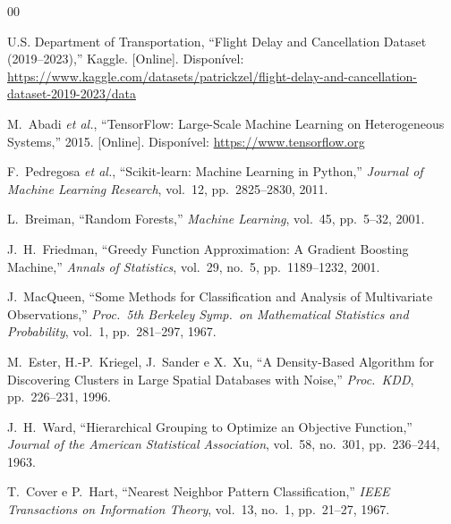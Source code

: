 \documentclass[conference]{IEEEtran}
\begin{document}
\begin{thebibliography}{00}

U.S. Department of Transportation, ``Flight Delay and Cancellation Dataset
(2019–2023),'' Kaggle. [Online]. Disponível:
\url{https://www.kaggle.com/datasets/patrickzel/flight-delay-and-cancellation-dataset-2019-2023/data}

M.~Abadi \textit{et al.}, ``TensorFlow: Large-Scale Machine Learning on
Heterogeneous Systems,'' 2015. [Online]. Disponível: \url{https://www.tensorflow.org}

F.~Pedregosa \textit{et al.}, ``Scikit-learn: Machine Learning in Python,''
\textit{Journal of Machine Learning Research}, vol.~12, pp.~2825--2830, 2011.

L.~Breiman, ``Random Forests,'' \textit{Machine Learning}, vol.~45, pp.~5--32, 2001.

J.~H.~Friedman, ``Greedy Function Approximation: A Gradient Boosting Machine,''
\textit{Annals of Statistics}, vol.~29, no.~5, pp.~1189--1232, 2001.

J.~MacQueen, ``Some Methods for Classification and Analysis of Multivariate
Observations,'' \textit{Proc.\ 5th Berkeley Symp.\ on Mathematical Statistics
and Probability}, vol.~1, pp.~281--297, 1967.

M.~Ester, H.-P.~Kriegel, J.~Sander e X.~Xu, ``A Density-Based Algorithm for
Discovering Clusters in Large Spatial Databases with Noise,''
\textit{Proc.\ KDD}, pp.~226--231, 1996.

J.~H.~Ward, ``Hierarchical Grouping to Optimize an Objective Function,''
\textit{Journal of the American Statistical Association}, vol.~58, no.~301,
pp.~236--244, 1963.

T.~Cover e P.~Hart, ``Nearest Neighbor Pattern Classification,''
\textit{IEEE Transactions on Information Theory}, vol.~13, no.~1,
pp.~21--27, 1967.

\end{thebibliography}
\end{document}
